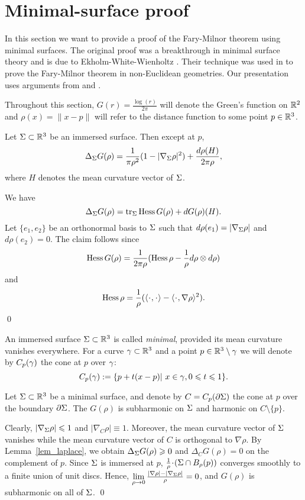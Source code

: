 \section{Minimal-surface proof}

In this section we want to provide a proof of the Fary-Milnor theorem using minimal surfaces.
The original proof was a breakthrough in minimal surface theory and is due to Ekholm-White-Wienholtz \cite{EWW_embed}. 
Their technique was used in \cite{CG_embed, St_structure} to prove the Fary-Milnor theorem in
non-Euclidean geometries. Our presentation uses arguments from \cite{EWW_embed} and \cite{CG_embed}.
\medskip

Throughout this section, $G(r)=\frac{\log(r)}{2\pi}$ will denote the Green's function on $\mathbb R^2$ and  $\rho(x)=\|x-p\|$ will refer to
the distance function to some point $p\in\mathbb R^3$.

\blem\label{lem_laplace} 
Let $\Sigma\subset \mathbb R^3$ be an immersed surface. Then except at $p$,
\[\Delta_\Sigma G(\rho)=\frac{1}{\pi\rho^2}(1-|\nabla_\Sigma \rho|^2)+\frac{d\rho(H)}{2\pi\rho},\]
where $H$ denotes the mean curvature vector of $\Sigma$. 
\elem

\proof
We have
\[\Delta_\Sigma G(\rho)=\operatorname{tr}_\Sigma\operatorname{Hess} G(\rho)+d G(\rho)(H).\]
Let $\{e_1,e_2\}$ be an orthonormal basis to $\Sigma$ such that $d\rho(e_1)=|\nabla_\Sigma \rho|$ and $d\rho(e_2)=0$. 
The claim follows since 
\[\operatorname{Hess} G(\rho)=\frac{1}{2\pi\rho}(\operatorname{Hess}\rho-\frac{1}{\rho}d\rho\otimes d\rho)\] 
and
\[\Hess\rho=\frac{1}{\rho}(\<\cdot,\cdot\>-\<\cdot,\nabla\rho\>^2).\]
\qed

\bdfn
An immersed surface $\Sigma\subset\mathbb R^3$ is called {\em minimal}, provided its mean curvature vanishes everywhere.
\edfn
For a curve $\gamma\subset\mathbb R^3$ and a point $p\in\mathbb R^3\setminus\gamma$ we will denote by $C_p(\gamma)$ the cone at $p$
over $\gamma$:
\[C_p(\gamma):=\{p+t(x-p)|\ x\in\gamma, 0\leqslant t\leqslant 1\}.\]
\medskip

\bcor\label{cor_subhar}
Let $\Sigma\subset\mathbb R^3$ be a minimal surface, and denote by $C=C_p(\partial\Sigma)$ the cone at $p$ over the boundary $\partial\Sigma$.
The $G(\rho)$ is subharmonic on $\Sigma$ and harmonic on $C\setminus\{p\}$.
\ecor

\proof
Clearly, $|\nabla_\Sigma\rho|\leqslant 1$ and $|\nabla_C\rho|\equiv 1$.
Moreover, the mean curvature vector of $\Sigma$ vanishes while the mean curvature vector of $C$
is orthogonal to $\nabla\rho$. By Lemma~\ref{lem_laplace}, we obtain $\Delta_\Sigma G(\rho)\geqslant 0$ and $\Delta_C G(\rho)= 0$
on the complement of $p$. Since $\Sigma$ is immersed at $p$, $\frac{1}{\rho}\cdot(\Si\cap B_\rho(p))$
converges smoothly to a finite union of unit discs. Hence, $\lim\limits_{\rho\to 0}\frac{|\nabla\rho|-|\nabla_\Sigma\rho|}{\rho}=0$, and
$G(\rho)$ is subharmonic on all of $\Sigma$.
\qed


